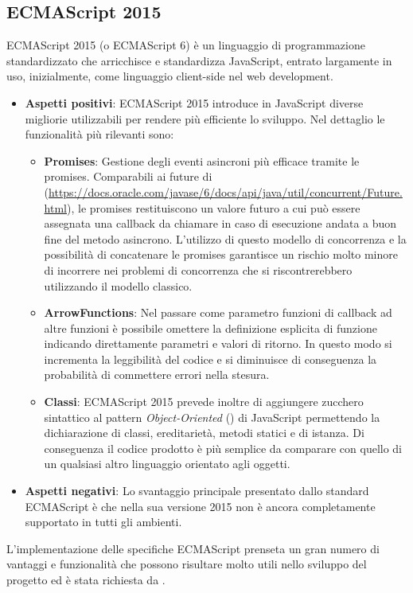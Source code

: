 \subsection{ECMAScript 2015}
ECMAScript 2015 (o ECMAScript 6) è un linguaggio di programmazione standardizzato che arricchisce e standardizza JavaScript, entrato largamente in uso, inizialmente, come linguaggio client-side nel web development.
\begin{itemize}
	\item \textbf{Aspetti positivi}: ECMAScript 2015 introduce in JavaScript diverse migliorie utilizzabili per rendere più efficiente lo sviluppo. Nel dettaglio le funzionalità più rilevanti sono:
	\begin{itemize}
		\item \textbf{Promises}: Gestione degli eventi asincroni più efficace tramite le promises. Comparabili ai future di  (\url{https://docs.oracle.com/javase/6/docs/api/java/util/concurrent/Future.html}), le promises restituiscono un valore futuro a cui può essere assegnata una callback da chiamare in caso di esecuzione andata a buon fine del metodo asincrono. L'utilizzo di questo modello di concorrenza e la possibilità di concatenare le promises garantisce un rischio molto minore di incorrere nei problemi di concorrenza che si riscontrerebbero utilizzando il modello classico.
		\item \textbf{ArrowFunctions}: Nel passare come parametro funzioni di callback ad altre funzioni è possibile omettere la definizione esplicita di funzione indicando direttamente parametri e valori di ritorno. In questo modo si incrementa la leggibilità del codice e si diminuisce di conseguenza la probabilità di commettere errori nella stesura.
		\item \textbf{Classi}: ECMAScript 2015 prevede inoltre di aggiungere zucchero sintattico al pattern \textit{Object-Oriented} () di JavaScript permettendo la dichiarazione di classi, ereditarietà, metodi statici e di istanza. Di conseguenza il codice prodotto è più semplice da comparare con quello di un qualsiasi altro linguaggio orientato agli oggetti. 
	\end{itemize}
	\item \textbf{Aspetti negativi}: Lo svantaggio principale presentato dallo standard ECMAScript è che nella sua versione 2015 non è ancora completamente supportato in tutti gli ambienti. 
\end{itemize}
L'implementazione delle specifiche ECMAScript prenseta un gran numero di vantaggi e funzionalità che possono risultare molto utili nello sviluppo del progetto ed è stata richiesta da \glossario{\Proponente}. 

